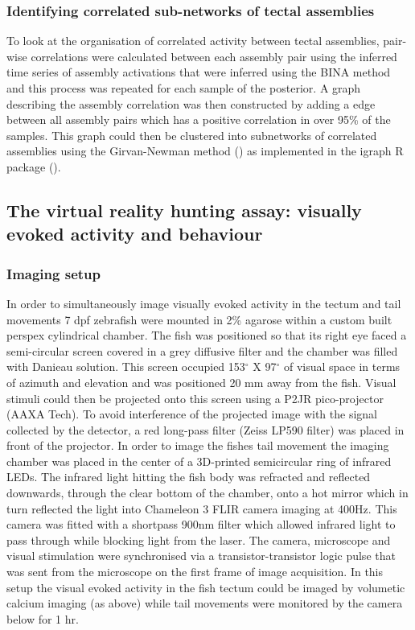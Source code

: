 \subsubsection{Identifying correlated sub-networks of tectal assemblies}

To look at the organisation of correlated activity between tectal assemblies, pair-wise correlations were calculated between each assembly pair using the inferred time series of assembly activations that were inferred using the BINA method and this process was repeated for each sample of the posterior. A graph describing the assembly correlation was then constructed by adding a edge between all assembly pairs which has a positive correlation in over 95\% of the samples. This graph could then be clustered into subnetworks of correlated assemblies using the Girvan-Newman method (\cite{Newman2004FindingNetworks}) as implemented in the igraph R package (\cite{Csardi2006TheResearch}).


\subsection{The virtual reality hunting assay: visually evoked activity and behaviour}
\subsubsection{Imaging setup}
In order to simultaneously image visually evoked activity in the tectum and  tail movements 7 \gls{dpf} zebrafish were mounted in 2\% agarose within a custom built perspex cylindrical chamber. The fish was positioned so that its right eye faced a semi-circular screen covered in a grey diffusive filter and the chamber was filled with Danieau solution. This screen occupied 153$^{\circ}$ X 97$^{\circ}$ of visual space in terms of azimuth and elevation and was positioned 20 mm away from the fish. Visual stimuli could then be projected onto this screen using a P2JR pico-projector (AAXA Tech). To avoid interference of the projected image with the signal collected by the detector, a red long-pass filter (Zeiss LP590 filter) was placed in front of the projector. In order to image the fishes tail movement the imaging chamber was placed in the center of a 3D-printed semicircular ring of infrared LEDs. The infrared light hitting the fish body was refracted and reflected downwards, through the clear bottom of the chamber, onto a hot mirror which in turn reflected the light into Chameleon 3 FLIR camera imaging at 400Hz. This camera was fitted with a shortpass 900nm filter which allowed infrared light to pass through while blocking light from the laser. The camera, microscope and visual stimulation were synchronised via a transistor-transistor logic pulse that was sent from the microscope on the first frame of image acquisition. In this setup the visual evoked activity in the fish tectum could be imaged by volumetic calcium imaging (as above) while tail movements were monitored by the camera below for 1 hr. 

